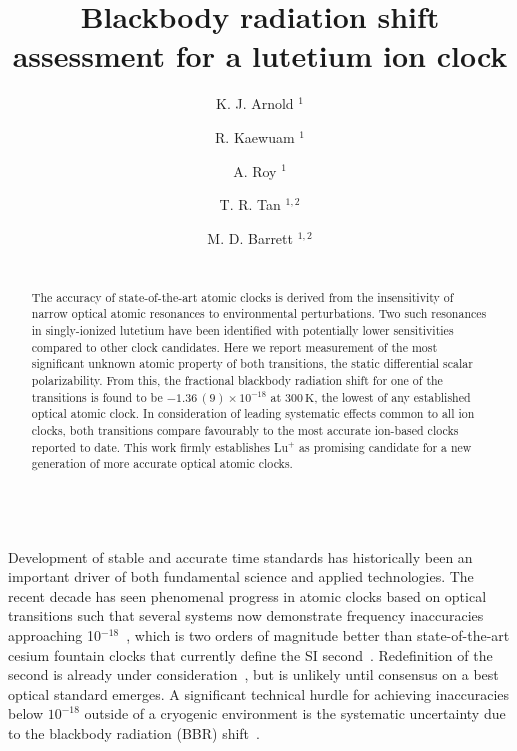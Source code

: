 \documentclass[pra,aps,showpacs,floatfix,twocolumn,nofootinbib,citeautoscript]{revtex4-1}
\begin{document}
\title{Blackbody radiation shift assessment for a lutetium ion clock}
\author{K. J. Arnold $^{1}$} 
 \author{ R. Kaewuam $^{1}$}
 \author{A. Roy $^{1}$}
 \author{T. R. Tan $^{1,2}$}
 \author{M. D. Barrett $^{1,2}$}

\begin{abstract}
\\ The accuracy of state-of-the-art atomic clocks is derived from the insensitivity of narrow optical atomic resonances to environmental perturbations.  Two such resonances in singly-ionized lutetium have been identified with potentially lower sensitivities compared to other clock candidates. Here we report measurement of the most significant unknown atomic property of both transitions, the static differential scalar polarizability.  From this, the fractional blackbody radiation shift for one of the transitions is found to be $-1.36\,(9) \times 10^{-18}$ at $300\,\mathrm{K}$, the lowest of any established optical atomic clock. In consideration of leading systematic effects common to all ion clocks, both transitions compare favourably to the most accurate ion-based clocks reported to date.  This work firmly establishes Lu$^+$ as promising candidate for a new generation of more accurate optical atomic clocks.
\end{abstract}

\maketitle

\\

Development of stable and accurate time standards has historically been an important driver of both fundamental science and applied technologies. The recent decade has seen phenomenal progress in atomic clocks based on optical transitions such that several systems now demonstrate frequency inaccuracies approaching 10$^{-18}$~\cite{SrYe2,YbPeik,AlIon}, which is two orders of magnitude better than state-of-the-art cesium fountain clocks that currently define the SI second~\cite{bauch2003caesium}. Redefinition of the second is already under consideration~\cite{gill2016,riehle2015}, but is unlikely until consensus on a best optical standard emerges.    A significant technical hurdle for achieving inaccuracies below $10^{-18}$ outside of a cryogenic environment is the systematic uncertainty due to the blackbody radiation (BBR) shift~\cite{itanoBBR}. 
\end{document}
